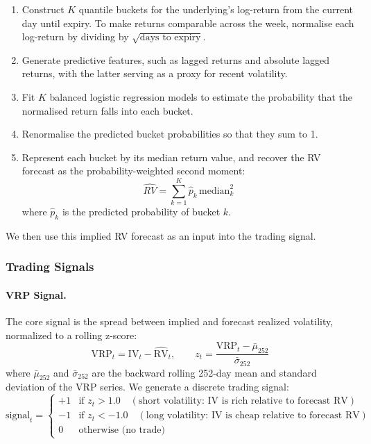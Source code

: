 \documentclass[11pt,a4paper]{article}
\begin{document}
\begin{enumerate}
    \item Construct \(K\) quantile buckets for the underlying’s log-return from the current day until expiry. To make returns comparable across the week, normalise each log-return by dividing by \(\sqrt{\text{days to expiry}}\).
    
    \item Generate predictive features, such as lagged returns and absolute lagged returns, with the latter serving as a proxy for recent volatility.
    
    \item Fit \(K\) balanced logistic regression models to estimate the probability that the normalised return falls into each bucket.
    
    \item Renormalise the predicted bucket probabilities so that they sum to 1.
    
    \item Represent each bucket by its median return value, and recover the RV forecast as the probability-weighted second moment:
    \[
    \hat{RV} = \sum_{k=1}^{K} \hat{p}_k \,\text{median}_k^2
    \]
    where \(\hat{p}_k\) is the predicted probability of bucket \(k\).
\end{enumerate}

We then use this implied RV forecast as an input into the trading signal.

\subsubsection{Trading Signals}

\paragraph{VRP Signal.}
The core signal is the spread between implied and forecast realized volatility, normalized to a rolling z-score:
\begin{equation}
    \text{VRP}_t = \text{IV}_t - \widehat{\text{RV}}_t, \qquad z_t = \frac{\text{VRP}_t - \bar{\mu}_{252}}{\bar{\sigma}_{252}}
\end{equation}
where $\bar{\mu}_{252}$ and $\bar{\sigma}_{252}$ are the backward rolling 252-day mean and standard deviation of the VRP series.
We generate a discrete trading signal:
\[
    \text{signal}_t = \begin{cases}
        +1 & \text{if } z_t > 1.0 \quad (\text{short volatility: IV is rich relative to forecast RV}) \\
        -1 & \text{if } z_t < -1.0 \quad (\text{long volatility: IV is cheap relative to forecast RV}) \\
        0  & \text{otherwise (no trade)}
    \end{cases}
\]
\end{document}
